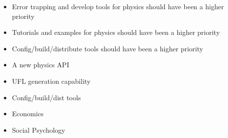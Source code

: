 \documentclass{beamer}
\begin{document}
\begin{frame}
\begin{itemize}
\item Error trapping and develop tools for physics should have been a
  higher priority
\item Tutorials and examples for physics should have been a higher
  priority
\item Config/build/distribute tools should have been a higher priority
\end{itemize}
\end{frame}

\begin{frame}
\begin{itemize}
\item A new physics API
\item UFL generation capability 
\item Config/build/dist tools
\item Economics
\item Social Psychology
\end{itemize}
\end{frame}
\end{document}
